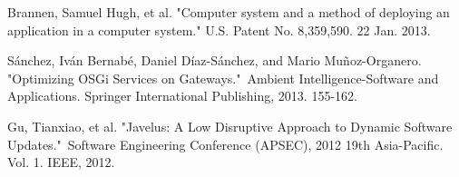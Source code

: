 \documentclass[conference]{IEEEtran}
\begin{document}
\begin{thebibliography}{9}
Brannen, Samuel Hugh, et al. "Computer system and a method of deploying an application in a computer system." U.S. Patent No. 8,359,590. 22 Jan. 2013.

Sánchez, Iván Bernabé, Daniel Díaz-Sánchez, and Mario Muñoz-Organero. "Optimizing OSGi Services on Gateways." Ambient Intelligence-Software and Applications. Springer International Publishing, 2013. 155-162.

Gu, Tianxiao, et al. "Javelus: A Low Disruptive Approach to Dynamic Software Updates." Software Engineering Conference (APSEC), 2012 19th Asia-Pacific. Vol. 1. IEEE, 2012.

\end{thebibliography}


\end{document}
